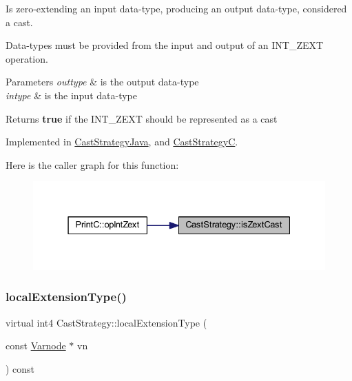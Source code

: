 Is zero-\/extending an input data-\/type, producing an output data-\/type, considered a cast. 

Data-\/types must be provided from the input and output of an I\+N\+T\+\_\+\+Z\+E\+XT operation. 
\begin{DoxyParams}{Parameters}
{\em outtype} & is the output data-\/type \\
\hline
{\em intype} & is the input data-\/type \\
\hline
\end{DoxyParams}
\begin{DoxyReturn}{Returns}
{\bfseries{true}} if the I\+N\+T\+\_\+\+Z\+E\+XT should be represented as a cast 
\end{DoxyReturn}


Implemented in \mbox{\hyperlink{class_cast_strategy_java_a6c8536d19ca90746652c78d0781e98b6}{Cast\+Strategy\+Java}}, and \mbox{\hyperlink{class_cast_strategy_c_a5c4b61d624a78a2e6f16bf2902e5b8e6}{Cast\+StrategyC}}.

Here is the caller graph for this function\+:
\nopagebreak
\begin{figure}[H]
\begin{center}
\leavevmode
\includegraphics[width=331pt]{class_cast_strategy_a472229904419d83774345e569cef92d2_icgraph}
\end{center}
\end{figure}
\mbox{\label{class_cast_strategy_af9c6535f6d9337185887dba89ccb9de3}} 
\subsubsection{\texorpdfstring{localExtensionType()}{localExtensionType()}}
{\footnotesize\ttfamily virtual int4 Cast\+Strategy\+::local\+Extension\+Type (\begin{DoxyParamCaption}\item[{const \mbox{\hyperlink{class_varnode}{Varnode}} $\ast$}]{vn }\end{DoxyParamCaption}) const\hspace{0.3cm}{\ttfamily [pure virtual]}}



